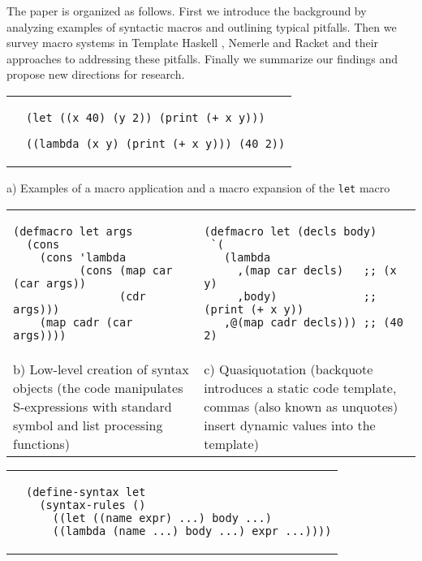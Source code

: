 \documentclass[10pt,journal,a4paper]{IEEEtran}
\begin{document}
The paper is organized as follows. First we introduce the background by analyzing examples
of syntactic macros and outlining typical pitfalls. Then we survey
macro systems in Template Haskell \cite{sheard02}, Nemerle \cite{skalski04} and Racket \cite{barzilay11}
and their approaches to addressing these pitfalls. Finally we summarize our findings
and propose new directions for research.

\begin{figure*}[t]
\begin{listing}
\normalsize

\begin{tabular}{p{4.0cm} p{15cm}}\\
 &
\begin{verbatim}
(let ((x 40) (y 2)) (print (+ x y)))

((lambda (x y) (print (+ x y))) (40 2))
\end{verbatim}
\end{tabular}

\begin{center}
a) Examples of a macro application and a macro expansion of the \small \texttt{let} \normalsize macro
\end{center}

\begin{tabular}{p{8.5cm} p{8.5cm}}\\
\begin{verbatim}
(defmacro let args
  (cons
    (cons 'lambda
          (cons (map car (car args))
                (cdr args)))
    (map cadr (car args))))
\end{verbatim}
&
\begin{verbatim}
(defmacro let (decls body)
 `(
   (lambda
     ,(map car decls)   ;; (x y)
     ,body)             ;; (print (+ x y))
   ,@(map cadr decls))) ;; (40 2)
\end{verbatim}\\
b) Low-level creation of syntax objects (the code manipulates S-expressions
with standard symbol and list processing functions)
&
c) Quasiquotation \cite{bawden99}
(backquote introduces a static code template, commas (also known as
unquotes) insert dynamic values into the template)
\end{tabular}

\begin{tabular}{p{3.5cm} p{13.5cm}}\\
 &
\begin{verbatim}
(define-syntax let
  (syntax-rules ()
    ((let ((name expr) ...) body ...)
    ((lambda (name ...) body ...) expr ...))))
\end{verbatim}
\end{tabular}


\end{listing}
\end{figure*}
\end{document}
